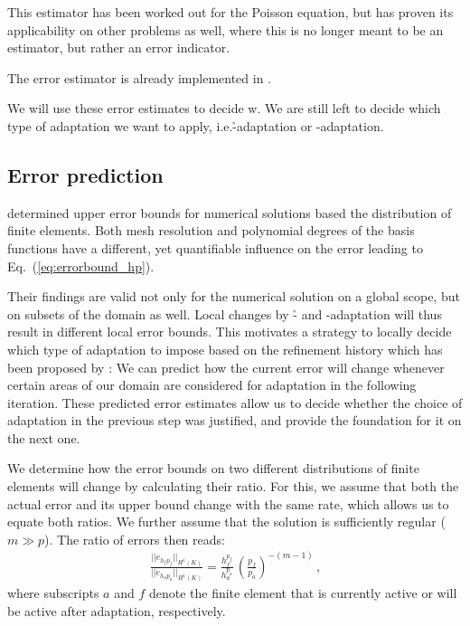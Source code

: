 This estimator has been worked out for the Poisson equation, but has proven its applicability on other problems as well, where this is no longer meant to be an estimator, but rather an error indicator.

The error estimator is already implemented in \dealii{}. 

We will use these error estimates to decide w. We are still left to decide which type of adaptation we want to apply, i.e.\@ \h-adaptation or \p-adaptation.



\subsection{Error prediction}
\label{ssec:prediction}

\cite{babuska1990} determined upper error bounds for numerical solutions based the distribution of finite elements. Both mesh resolution and polynomial degrees of the basis functions have a different, yet quantifiable influence on the error leading to Eq.~(\ref{eq:errorbound_hp}).

Their findings are valid not only for the numerical solution on a global scope, but on subsets of the domain as well. Local changes by \h- and \p-adaptation will thus result in different local error bounds. This motivates a strategy to locally decide which type of adaptation to impose based on the refinement history which has been proposed by \textcite{melenk2001}: We can predict how the current error will change whenever certain areas of our domain are considered for adaptation in the following iteration. These predicted error estimates allow us to decide whether the choice of adaptation in the previous step was justified, and provide the foundation for it on the next one.

We determine how the error bounds on two different distributions of finite elements will change by calculating their ratio. For this, we assume that both the actual error and its upper bound change with the same rate, which allows us to equate both ratios. We further assume that the solution is sufficiently regular ($m \gg p$). The ratio of errors then reads:
\begin{align}
\label{eq:errorratio_hp} \frac{||e_{h_f p_f}||_{H^{1}(K)}}{||e_{h_a p_a}||_{H^{1}(K)}} = \frac{h_f^{p_f}}{h_a^{p_a}} \, \left(\frac{p_f}{p_a}\right)^{-(m-1)} \,\text{,}
\end{align}
where subscripts $a$ and $f$ denote the finite element that is currently active or will be active after adaptation, respectively.

